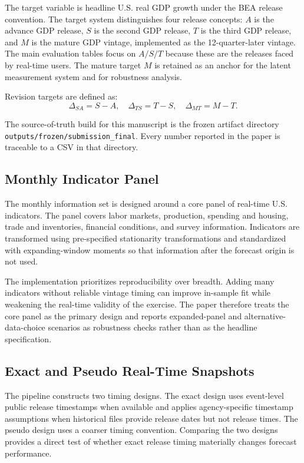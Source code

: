 \documentclass[12pt]{article}
\begin{document}
The target variable is headline U.S. real GDP growth under the BEA release convention. The target system distinguishes four release concepts: $A$ is the advance GDP release, $S$ is the second GDP release, $T$ is the third GDP release, and $M$ is the mature GDP vintage, implemented as the 12-quarter-later vintage. The main evaluation tables focus on $A/S/T$ because these are the releases faced by real-time users. The mature target $M$ is retained as an anchor for the latent measurement system and for robustness analysis.

Revision targets are defined as:
\begin{equation}
\Delta_{SA}=S-A,\quad \Delta_{TS}=T-S,\quad \Delta_{MT}=M-T.
\end{equation}

The source-of-truth build for this manuscript is the frozen artifact directory \texttt{outputs/frozen/submission\_final}. Every number reported in the paper is traceable to a CSV in that directory.

\subsection{Monthly Indicator Panel}

The monthly information set is designed around a core panel of real-time U.S. indicators. The panel covers labor markets, production, spending and housing, trade and inventories, financial conditions, and survey information. Indicators are transformed using pre-specified stationarity transformations and standardized with expanding-window moments so that information after the forecast origin is not used.

The implementation prioritizes reproducibility over breadth. Adding many indicators without reliable vintage timing can improve in-sample fit while weakening the real-time validity of the exercise. The paper therefore treats the core panel as the primary design and reports expanded-panel and alternative-data-choice scenarios as robustness checks rather than as the headline specification.

\subsection{Exact and Pseudo Real-Time Snapshots}

The pipeline constructs two timing designs. The exact design uses event-level public release timestamps when available and applies agency-specific timestamp assumptions when historical files provide release dates but not release times. The pseudo design uses a coarser timing convention. Comparing the two designs provides a direct test of whether exact release timing materially changes forecast performance.
\end{document}
